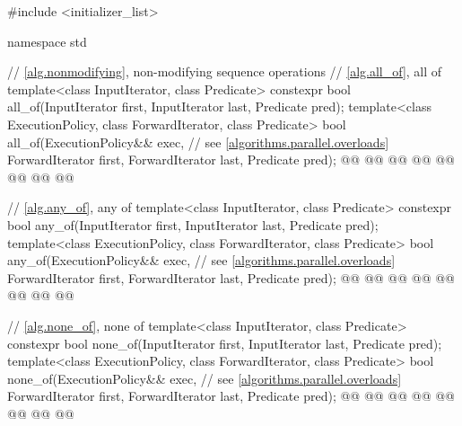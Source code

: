 \begin{codeblock}
#include <initializer_list>

namespace std {
  // \ref{alg.nonmodifying}, non-modifying sequence operations
  // \ref{alg.all_of}, all of
  template<class InputIterator, class Predicate>
    constexpr bool all_of(InputIterator first, InputIterator last, Predicate pred);
  template<class ExecutionPolicy, class ForwardIterator, class Predicate>
    bool all_of(ExecutionPolicy&& exec, // see \ref{algorithms.parallel.overloads}
                ForwardIterator first, ForwardIterator last, Predicate pred);
  @@
    @@
        @@
      @@
    @@
        @@
      @@
  @\added{\}}@

  // \ref{alg.any_of}, any of
  template<class InputIterator, class Predicate>
    constexpr bool any_of(InputIterator first, InputIterator last, Predicate pred);
  template<class ExecutionPolicy, class ForwardIterator, class Predicate>
    bool any_of(ExecutionPolicy&& exec, // see \ref{algorithms.parallel.overloads}
                ForwardIterator first, ForwardIterator last, Predicate pred);
  @@
    @@
        @@
      @@
    @@
        @@
      @@
  @\added{\}}@

  // \ref{alg.none_of}, none of
  template<class InputIterator, class Predicate>
    constexpr bool none_of(InputIterator first, InputIterator last, Predicate pred);
  template<class ExecutionPolicy, class ForwardIterator, class Predicate>
    bool none_of(ExecutionPolicy&& exec, // see \ref{algorithms.parallel.overloads}
                 ForwardIterator first, ForwardIterator last, Predicate pred);
  @@
    @@
        @@
      @@
    @@
        @@
      @@
  @\added{\}}@

}
\end{codeblock}
